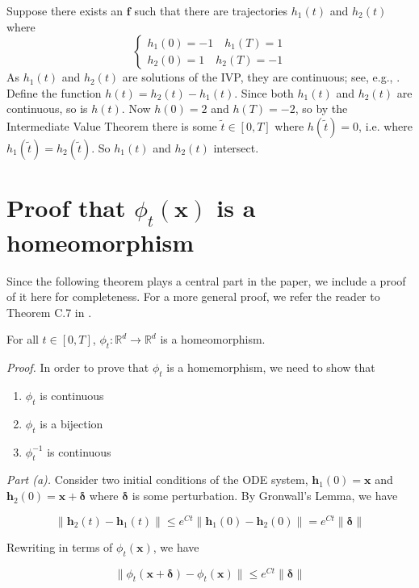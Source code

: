 \documentclass{article}
\begin{document}
Suppose there exists an $\mathbf{f}$ such that there are trajectories $h_1(t)$ and $h_2(t)$ where
\[
\begin{cases}
       h_1(0) = -1 \quad h_1(T) = 1 \\
       h_2(0) = 1 \quad h_2(T) = -1
\end{cases}
\]
As $h_1(t)$ and $h_2(t)$ are solutions of the IVP, they are continuous; see, e.g., \cite{coddington1955theory}. Define the function $h(t) = h_2(t) - h_1(t)$. Since both $h_1(t)$ and $h_2(t)$ are continuous, so is $h(t)$. Now $h(0) = 2$ and $h(T) = -2$, so by the Intermediate Value Theorem there is some $\tilde{t} \in [0, T]$ where $h(\tilde{t}) = 0$, i.e. where $h_1(\tilde{t}) = h_2(\tilde{t})$. So $h_1(t)$ and $h_2(t)$ intersect.

\section{Proof that $\phi_t(\mathbf{x})$ is a homeomorphism}

Since the following theorem plays a central part in the paper, we include a proof of it here for completeness. For a more general proof, we refer the reader to Theorem C.7 in \cite{younes2010shapes}.

\begin{theorem*} For all $t \in [0, T]$, $\phi_t : \mathbb{R}^d \to \mathbb{R}^d$ is a homeomorphism.
\end{theorem*}

\textit{Proof.} In order to prove that $\phi_t$ is a homemorphism, we need to show that

\begin{enumerate}[label=(\alph*)]
    \item $\phi_t$ is continuous
    \item $\phi_t$ is a bijection
    \item $\phi_t^{-1}$ is continuous
\end{enumerate}

\textit{Part (a).} Consider two initial conditions of the ODE system, $\mathbf{h}_1(0) = \mathbf{x}$ and $\mathbf{h}_2(0) = \mathbf{x} + \mathbf{\delta}$ where $\mathbf{\delta}$ is some perturbation. By Gronwall's Lemma, we have

$$\|\mathbf{h}_2(t) - \mathbf{h}_1(t)\| \leq e^{Ct}\|\mathbf{h}_1(0) - \mathbf{h}_2(0)\| = e^{Ct}\|\mathbf{\delta}\|$$

Rewriting in terms of $\phi_t(\mathbf{x})$, we have

$$\|\phi_t(\mathbf{x + \mathbf{\delta}}) - \phi_t(\mathbf{x})\| \leq e^{Ct}\|\mathbf{\delta}\|$$
\end{document}
